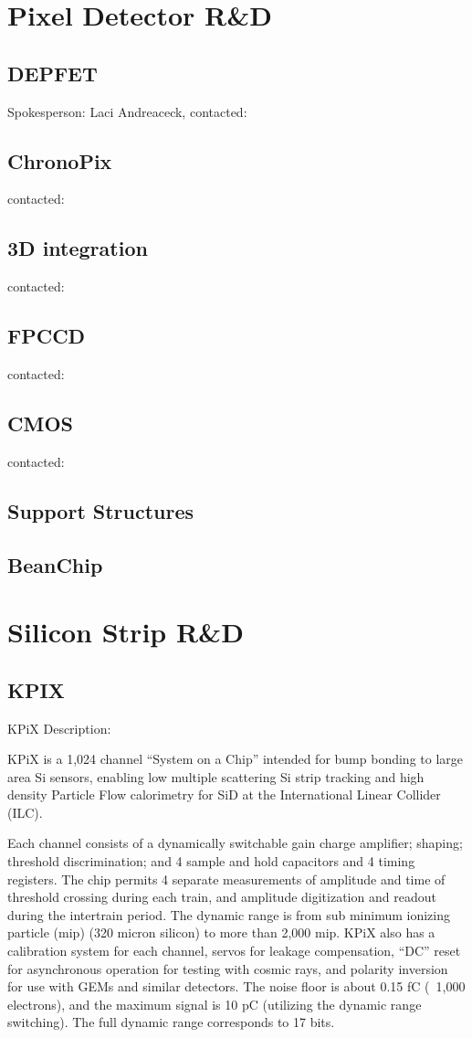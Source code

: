 \documentclass[11pt]{article}
\begin{document}
\section{Pixel Detector R\&D}
\subsection{DEPFET}
Spokesperson: Laci Andreaceck,
contacted: 
\subsection{ChronoPix}
contacted:
\subsection{3D integration}
contacted:
\subsection{FPCCD}
contacted:
\subsection{CMOS}
contacted:
\subsection{Support Structures}
\subsection{BeanChip}
\section{Silicon Strip R\&D}
\subsection{KPIX}
KPiX Description:

KPiX is a 1,024 channel “System on a Chip” intended for bump bonding to large area Si sensors, enabling low multiple scattering Si strip tracking and high density Particle Flow calorimetry for SiD at the International Linear Collider (ILC).

Each channel consists of a dynamically switchable gain charge amplifier; shaping; threshold discrimination; and 4 sample and hold capacitors and 4 timing registers. The chip permits 4 separate measurements of amplitude and time of threshold crossing during each train, and amplitude digitization and readout during the intertrain period. The dynamic range is from sub minimum ionizing particle (mip) (320 micron silicon) to more than 2,000 mip. KPiX also has a calibration system for each channel, servos for leakage compensation, “DC” reset for asynchronous operation for testing with cosmic rays, and polarity inversion for use with GEMs and similar detectors. The noise floor is about 0.15 fC (~1,000 electrons), and the maximum signal is 10 pC (utilizing the dynamic range switching). The full dynamic range corresponds to 17 bits. 
\end{document}
